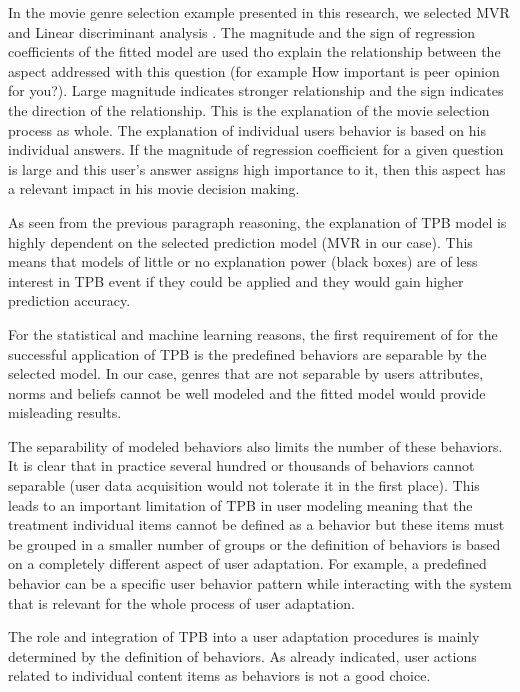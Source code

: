 \documentclass{llncs}
\begin{document}
In the movie genre selection example presented in this research, we selected MVR \cite{CohenCohenWestAiken200208} and Linear discriminant analysis \cite{RencherChristensen201207}. The magnitude and the sign of regression coefficients of the fitted model are used tho explain the relationship between  the aspect addressed with this question (for example How important is peer opinion for you?). Large magnitude indicates stronger relationship and the sign indicates the direction of the relationship. This is the explanation of the movie selection process as whole. The explanation of individual users behavior is based on his individual answers. If the magnitude of regression coefficient for a given question is large and this user's answer assigns high importance to it, then this aspect has a relevant impact in his movie decision making. 

As seen from the previous paragraph reasoning, the explanation of TPB model is highly dependent on the selected prediction model (MVR in our case). This means that models of little or no explanation power (black boxes) are of less interest in TPB event if they could be applied and they would gain higher prediction accuracy. 

\vspace{0.6em}
  For the statistical and machine learning reasons, the first requirement of for the successful application of TPB is the predefined behaviors are separable by the selected model. In our case, genres that are not separable by users attributes, norms and beliefs cannot be well modeled and  the fitted model would provide misleading results. 

The separability of modeled behaviors also limits the number of these behaviors. It is clear that in practice several hundred or thousands of behaviors cannot separable (user data acquisition would not tolerate it in the first place). This leads to an important limitation of TPB in user modeling meaning that the treatment individual items cannot be defined as a behavior but these items must be grouped in a smaller number of groups or the definition of behaviors is based on a completely different aspect of user adaptation. For example, a predefined behavior can be a specific user behavior pattern while interacting with the system that is relevant for the whole process of user adaptation. 

\vspace{0.6em}
 The role and integration of TPB into a user adaptation procedures is mainly determined by the definition of behaviors. As already indicated, user actions related to individual content items as behaviors is not a good choice. 
\end{document}
